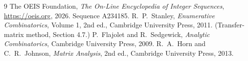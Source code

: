 \documentclass[11pt,a4paper]{article}
\theoremstyle{plain}
\theoremstyle{definition}
\begin{document}
\begin{thebibliography}{9}
 The OEIS Foundation, \emph{The On-Line Encyclopedia of Integer
Sequences}, \url{https://oeis.org}, 2026. Sequence A234185.
 R.~P.~Stanley, \emph{Enumerative Combinatorics}, Volume 1, 2nd ed.,
Cambridge University Press, 2011. (Transfer-matrix method, Section 4.7.)
 P.~Flajolet and R.~Sedgewick, \emph{Analytic Combinatorics}, Cambridge
University Press, 2009.
 R.~A.~Horn and C.~R.~Johnson, \emph{Matrix Analysis}, 2nd ed., Cambridge
University Press, 2013.
\end{thebibliography}
\end{document}
